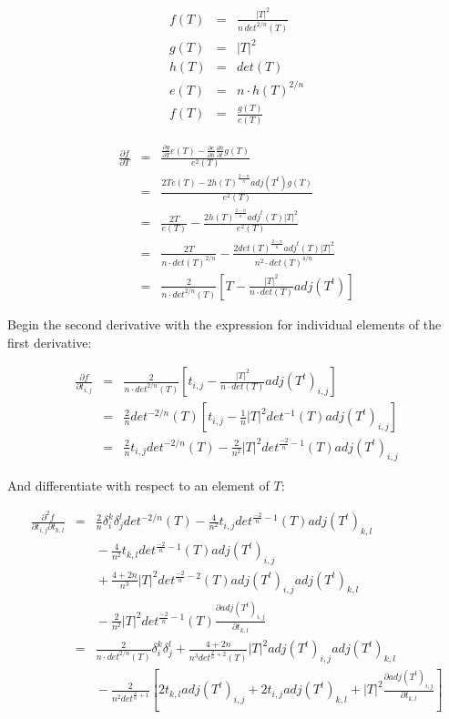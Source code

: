 \documentclass{report}
\begin{document}
\begin{eqnarray}
f(T) & = & \frac{|T|^2}{n \, det^{2/n}(T)} \\
g(T) & = & |T|^2 \\
h(T) & = & det(T) \\
e(T) & = & n \cdot h(T)^{2/n} \\
f(T) & = & \frac{g(T)}{e(T)} 
\end{eqnarray}
 
\begin{eqnarray}
\frac{\partial f}{\partial T} &=& \frac{
\frac{\partial g}{\partial T} e(T) - 
\frac{\partial e}{\partial h} \frac{\partial h}{\partial t} g(T)}
{e^2(T)} \\
&=& 
\frac{2 T e(T) - 
2 h(T)^\frac{2-n}{n} adj(T^t) g(T)}
{e^2(T)} \\
& = &  
\frac{2 T}{e(T)} -
\frac{2 h(T)^{\frac{2-n}{n}} adj^t(T) |T|^2}{e^2(T)} \\
& = &  
\frac{2 T}{n \cdot det(T)^{2/n}} -
\frac{2 det(T)^{\frac{2-n}{n}} adj^t(T) |T|^2}{n^2 \cdot det(T)^{4/n}} \\
& = &  
\frac{2}{n \cdot det^{2/n}(T)}\left[ T - \frac{|T|^2}{n \cdot det(T)} adj(T^t) \right]
\end{eqnarray}

\noindent Begin the second derivative with the  expression for individual elements of the first derivative:

\begin{eqnarray}
\frac{\partial f}{\partial t_{i,j}} & = & 
\frac{2}{n \cdot det^{2/n}(T)}\left[ t_{i,j} - \frac{|T|^2}{n \cdot det(T)} adj(T^t)_{i,j} \right] \\
 & = & 
\frac{2}{n}det^{-2/n}(T)\left[ t_{i,j} - \frac{1}{n}|T|^2 det^{-1}(T) adj(T^t)_{i,j}\right] \\
 & = &
\frac{2}{n} t_{i,j} det^{-2/n}(T) - \frac{2}{n^2} |T|^2 det^{\frac{-2}{n} - 1}(T) adj(T^t)_{i,j} 
\end{eqnarray}

\noindent And differentiate with respect to an element of $T$:

\begin{eqnarray}
\nonumber
\frac{\partial^2 f}{\partial t_{i,j} \partial t_{k,l}} & = &
\frac{2}{n} \delta_i^k \delta_j^l det^{-2/n}(T) 
  - \frac{4}{n^2} t_{i,j} det^{\frac{-2}{n}-1}(T) adj(T^t)_{k,l} \\
\nonumber
  & & {} - \frac{4}{n^2}t_{k,l} det^{\frac{-2}{n} - 1}(T) adj(T^t)_{i,j} \\
\nonumber
  & & {} + \frac{4+2n}{n^3} |T|^2 det^{\frac{-2}{n} - 2}(T) adj(T^t)_{i,j} adj(T^t)_{k,l} \\
  & & {} - \frac{2}{n^2} |T|^2 det^{\frac{-2}{n} - 1}(T) \frac{\partial adj(T^t)_{i,j}}{\partial t_{k,l}} \\
 & = & \frac{2}{n \cdot det^{2/n}(T)} \delta_i^k \delta_j^l
     + \frac{4 + 2n}{n^3 det^{\frac{2}{n}+2}(T)} |T|^2 adj(T^t)_{i,j} adj(T^t)_{k,l} \\
\nonumber
& & {} - \frac{2}{n^2 det^{\frac{2}{n}+1}} \left[ 
     2 t_{k,l} adj(T^t)_{i,j} + 2 t_{i,j} adj(T^t)_{k,l}
     + |T|^2 \frac{\partial adj(T^t)_{i,j}}{\partial t_{k,l}} \right] 
\end{eqnarray}
\end{document}
